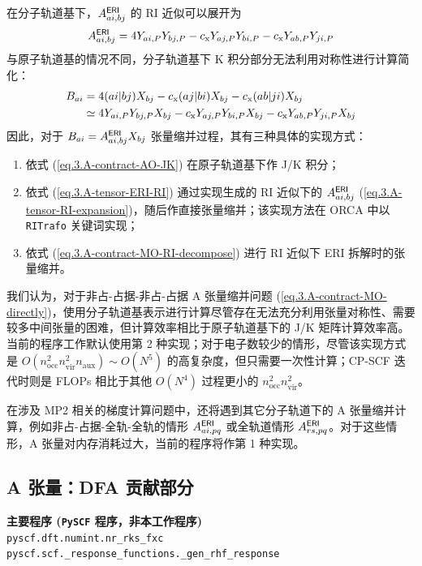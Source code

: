 在分子轨道基下，$A_{ai, bj}^{\textsf{ERI}}$ 的 RI 近似可以展开为
\begin{equation}
    \label{eq.3.A-tensor-ERI-RI}
    A_{ai, bj}^{\textsf{ERI}} = 4 Y_{ai, P} Y_{bj, P} - c_\mathrm{x} Y_{aj, P} Y_{bi, P} - c_\mathrm{x} Y_{ab, P} Y_{ji, P}
\end{equation}
与原子轨道基的情况不同，分子轨道基下 K 积分部分无法利用对称性进行计算简化：
\begin{align}
    \label{eq.3.A-contract-MO-RI-decompose}
    B_{ai} &= 4 (ai | bj) X_{bj} - c_\mathrm{x} (aj | bi) X_{bj} - c_\mathrm{x} (ab | ji) X_{bj} \notag\\
    &\simeq 4 Y_{ai, P} Y_{bj, P} X_{bj} - c_\mathrm{x} Y_{aj, P} Y_{bi, P} X_{bj} - c_\mathrm{x} Y_{ab, P} Y_{ji, P} X_{bj}
\end{align}
因此，对于 $B_{ai} = A_{ai, bj}^{\textsf{ERI}} X_{bj}$ 张量缩并过程，其有三种具体的实现方式：
\begin{enumerate}[nosep]
    \item 依式 (\ref{eq.3.A-contract-AO-JK}) 在原子轨道基下作 J/K 积分；
    \item 依式 (\ref{eq.3.A-tensor-ERI-RI}) 通过实现生成的 RI 近似下的 $A_{ai, bj}^{\textsf{ERI}}$ (\ref{eq.3.A-tensor-RI-expansion})，随后作直接张量缩并；该实现方法在 ORCA 中以 \verb|RITrafo| 关键词实现；
    \item 依式 (\ref{eq.3.A-contract-MO-RI-decompose}) 进行 RI 近似下 ERI 拆解时的张量缩并。
\end{enumerate}
我们认为，对于非占-占据-非占-占据 A 张量缩并问题 (\ref{eq.3.A-contract-MO-directly})，使用分子轨道基表示进行计算尽管存在无法充分利用张量对称性、需要较多中间张量的困难，但计算效率相比于原子轨道基下的 J/K 矩阵计算效率高。当前的程序工作默认使用第 2 种实现；对于电子数较少的情形，尽管该实现方式是 $O(n_\mathrm{occ}^2 n_\mathrm{vir}^2 n_\mathrm{aux}) \sim O(N^5)$ 的高复杂度，但只需要一次性计算；CP-SCF 迭代时则是 FLOPs 相比于其他 $O(N^4)$ 过程更小的 $n_\mathrm{occ}^2 n_\mathrm{vir}^2$。

在涉及 MP2 相关的梯度计算问题中，还将遇到其它分子轨道下的 A 张量缩并计算，例如非占-占据-全轨-全轨的情形 $A_{ai, pq}^{\textsf{ERI}}$ 或全轨道情形 $A_{rs, pq}^{\textsf{ERI}}$。对于这些情形，A 张量对内存消耗过大，当前的程序将作第 1 种实现。

\subsection{A 张量：DFA 贡献部分}
\label{sec.3.a-tensor-dfa}

\begin{tcolorbox}
    \textbf{主要程序 (\texttt{PySCF} 程序，非本工作程序)}\\
    \verb|pyscf.dft.numint.nr_rks_fxc|\\
    \verb|pyscf.scf._response_functions._gen_rhf_response|
\end{tcolorbox}

